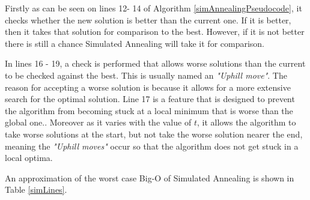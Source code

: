 \documentclass[12pt]{report}
\begin{document}
Firstly as can be seen on lines 12- 14 of Algorithm \ref{simAnnealingPseudocode}, it checks whether the new solution is better than the current one. If it is better, then it takes that solution for comparison to the best. However, if it is not better there is still a chance Simulated Annealing will take it for comparison. 

In lines 16 - 19, a check is performed that allows worse solutions than the current to be checked against the best. This is usually named an \textit{"Uphill move"}. The reason for accepting a worse solution is because it allows for a more extensive search for the optimal solution. Line 17 is a feature that is designed to prevent the algorithm from becoming stuck at a local minimum that is worse than the global one.\cite{simAnnealing}. Moreover as it varies with the value of $t$, it allows the algorithm to take worse solutions at the start, but not take the worse solution nearer the end, meaning the \textit{"Uphill moves"} occur so that the algorithm does not get stuck in a local optima.

An approximation of the worst case Big-O of Simulated Annealing is shown in Table \ref{simLines}.
\end{document}
